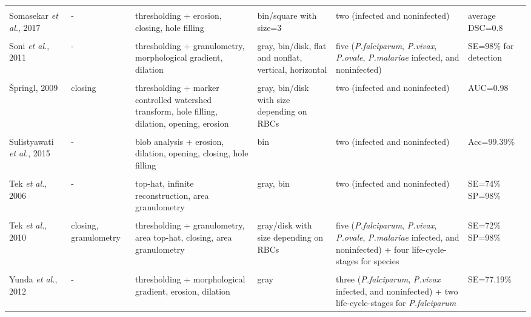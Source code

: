 \begin{longtable}{C{2.1cm} C{2.7cm} C{2.2cm} C{2.0cm} C{2.7cm} C{2.0cm} }
&   &  &  &  & \\
    Somasekar \emph{et al.}, 2017  &
    	- &
    	thresholding + erosion, closing, hole filling  &
    	bin/square with size=3 &
    	two (infected and noninfected) &
    	average DSC=0.8
    \\
&   &  &  &  & \\
    Soni \emph{et al.}, 2011  &
    	- &
    	thresholding + granulometry, morphological gradient, dilation  &
    	gray, bin/disk, flat and nonflat, vertical, horizontal &
    	five (\emph{P.falciparum}, \emph{P.vivax}, \emph{P.ovale}, \emph{P.malariae} infected, and noninfected) &
    	SE=98\% for detection
    \\
&   &  &  &  & \\
{\v{S}}pringl, 2009  &
    	closing &
    	thresholding + marker controlled watershed transform, hole filling, dilation, opening, erosion  &
    	gray, bin/disk with size depending on RBCs &
    	two (infected and noninfected) &
    	AUC=0.98
    \\
&   &  &  &  & \\
    Sulistyawati \emph{et al.}, 2015  &
    	- &
    	blob analysis + erosion, dilation, opening, closing, hole filling  &
    	bin &
    	two (infected and noninfected) &
    	Acc=99.39\%
    \\
&   &  &  &  & \\
 Tek \emph{et al.}, 2006  &
    	- &
    	top-hat, infinite reconstruction, area granulometry  &
    	gray, bin &
    	two (infected and noninfected) &
    	SE=74\% SP=98\%
    \\
&   &  &  &  & \\
    Tek \emph{et al.}, 2010  &
    	closing, granulometry &
    	thresholding + granulometry, area top-hat, closing, area granulometry &
    	gray/disk with size depending on RBCs &
    	five (\emph{P.falciparum}, \emph{P.vivax}, \emph{P.ovale}, \emph{P.malariae} infected, and noninfected) +
    four life-cycle-stages for species &
    	SE=72\% SP=98\%
    \\
&   &  &  &  & \\
    Yunda \emph{et al.}, 2012  &
    	- &
    	thresholding + morphological gradient, erosion, dilation  &
    	gray &
    	three (\emph{P.falciparum}, \emph{P.vivax} infected, and noninfected) + two life-cycle-stages for \emph{P.falciparum}&
    	SE=77.19\% \\
    	  	

\end{longtable}
